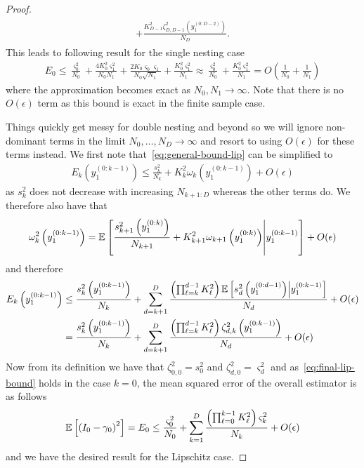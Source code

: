 \begin{proof}
\begin{align}
\begin{split}
+\frac{K_{D-1}^2 \zeta^2_{D,D-1}\left(y_1^{(0:D-2)}\right)}{N_D}.
\end{split}
\end{align}
This leads to following result for the single nesting case
\begin{align}
E_0 \le \frac{\varsigma^2_0}{N_0}+\frac{4 K_{0}^2 \varsigma_1^2}{N_0 N_{1}}
+\frac{2 K_{0}\varsigma_{0} \varsigma_1}{N_{0} \sqrt{N_1}}+\frac{K_0 ^2 \varsigma_1^2}{N_1}
\approx \frac{\varsigma^2_0}{N_0}+\frac{K_0 ^2 \varsigma_1^2}{N_1} = O\left(\frac{1}{N_0}+\frac{1}{N_1}\right)
\end{align}
where the approximation becomes exact as $N_0,N_1 \rightarrow \infty$.
Note that there is no $O\left(\epsilon\right)$ term as this bound is exact
in the finite sample case.

Things quickly get messy for double nesting and beyond so we will
ignore non-dominant terms in the limit $N_0,\dots,N_D \rightarrow \infty$
and resort to using $O(\epsilon)$ for these terms instead. 
We first note that~\eqref{eq:general-bound-lip} can be simplified to
\begin{align}
E_k \left(y_1^{(0:k-1)}\right) \le 
\frac{s_k^2}{N_k} + K_k^2 \omega_k \left(y_1^{(0:k-1)}\right) + O(\epsilon)
\end{align}
as $s_k^2$ does not decrease with increasing $N_{k+1:D}$ whereas the other
terms do.  We therefore also have that
\begin{align}
\omega_k^2 \left(y_1^{(0:k-1)}\right) = \mathbb{E} \left[ \frac{s_{k+1}^2\left(y_1^{(0:k)}\right)}
{N_{k+1}} + K^2_{k+1} \omega_{k+1} \left(y_1^{(0:k)}\right) \middle|
y_1^{(0:k-1)}\right] + O(\epsilon)
\end{align}
and therefore
\begin{align}
E_k \left(y_1^{(0:k-1)}\right) &\le  \frac{s_k^2\left(y_1^{(0:k-1)}\right)}{N_k} +
\sum_{d=k+1}^{D} \frac{\left(\prod_{\ell=k}^{d-1} K_{\ell}^2\right)
	\mathbb{E} \left[ s_{d}^2 \left(y_1^{(0:d-1)}\right) \middle|
	y_1^{(0:k-1)}\right]}{N_{d}}+ O(\epsilon) \\
&= \frac{s_k^2\left(y_1^{(0:k-1)}\right)}{N_k} +
\sum_{d=k+1}^{D} \frac{\left(\prod_{\ell=k}^{d-1} K_{\ell}^2\right)
	\zeta_{d,k}^2\left(y_1^{(0:k-1)}\right)}{N_{d}}+ O(\epsilon)
\label{eq:final-lip-bound}
\end{align}
Now from its definition we have that
$\zeta_{0,0}^2 = s_0^2$ and $\zeta_{d,0}^2 = \varsigma_d^2$ and
as~\eqref{eq:final-lip-bound} holds in the case $k=0$, 
the mean squared error of the overall estimator is as follows
\begin{align}
\mathbb{E} \left[\left(I_0-\gamma_0\right)^2\right] 
= E_0 \le 
\frac{\varsigma_{0}^2}{N_0} +
\sum_{k=1}^{D} \frac{\left(\prod_{\ell=0}^{k-1} K_{\ell}^2\right)
	\varsigma_{k}^2}{N_{k}}+ O(\epsilon)
\end{align}
and we have the desired result for the Lipschitz case.


\end{proof}
